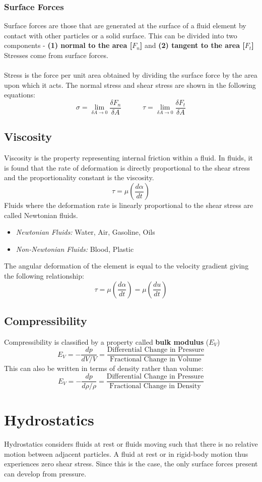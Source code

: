 \documentclass[11pt]{article}
\begin{document}
\subsubsection{Surface Forces}
Surface forces are those that are generated at the surface of a fluid element by contact with other particles or a solid surface. This can be divided into two components - \textbf{(1) normal to the area [$F_n$]} and \textbf{(2) tangent to the area [$F_t$]} Stresses come from surface forces.
\\ \\
Stress is the force per unit area obtained by dividing the surface force by the area upon which it acts. The normal stress and shear stress are shown in the following equations:
$$ \sigma = \lim_{\delta A \to 0} \frac{\delta F_n}{\delta A} \quad \quad \quad \tau = \lim_{\delta A \to 0} \frac{\delta F_t}{\delta A}$$
\subsection{Viscosity}
Viscosity is the property representing internal friction within a fluid. In fluids, it is found that the rate of deformation is directly proportional to the shear stress and the proportionality constant is the viscosity.
$$ \tau = \mu\left(\frac{d\alpha}{dt}\right) $$
Fluids where the deformation rate is linearly proportional to the shear stress are called Newtonian fluids.
\begin{itemize}
\item \textit{Newtonian Fluids:} Water, Air, Gasoline, Oils
\item \textit{Non-Newtonian Fluids:} Blood, Plastic
\end{itemize}
The angular deformation of the element is equal to the velocity gradient giving the following relationship:
$$ \tau = \mu\left(\frac{d\alpha}{dt}\right) = \mu\left(\frac{du}{dt}\right) $$

\subsection{Compressibility}
Compressibility is classified by a property called \textbf{bulk modulus} ($E_V$)
$$ E_V = -\frac{dp}{dV/V} = \frac{\text{Differential Change in Pressure}}{\text{Fractional Change in Volume}}$$
This can also be written in terms of density rather than volume:
$$ E_V = -\frac{dp}{d\rho/\rho} = \frac{\text{Differential Change in Pressure}}{\text{Fractional Change in Density}}$$
\pagebreak

\section{Hydrostatics}
Hydrostatics considers fluids at rest or fluids moving such that there is no relative motion between adjacent particles. A fluid at rest or in rigid-body motion thus experiences zero shear stress. Since this is the case, the only surface forces present can develop from pressure. 
\end{document}
